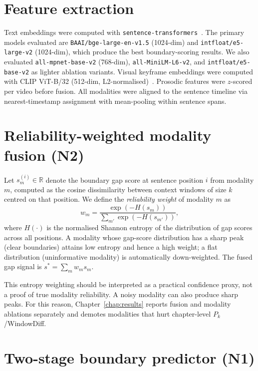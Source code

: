 \section{Feature extraction}
\label{sec:features}

Text embeddings were computed with \texttt{sentence-transformers}~\citep{reimers2019sbert}.
The primary models evaluated are \texttt{BAAI/bge-large-en-v1.5} (1024-dim) and
\texttt{intfloat/e5-large-v2} (1024-dim), which produce the best boundary-scoring
results. We also evaluated \texttt{all-mpnet-base-v2} (768-dim), \texttt{all-MiniLM-L6-v2},
and \texttt{intfloat/e5-base-v2} as lighter ablation variants.
Visual keyframe embeddings were computed with CLIP ViT-B/32
(512-dim, L2-normalised)~\citep{radford2021clip}.
Prosodic features were $z$-scored per video before fusion.
All modalities were aligned to the sentence timeline via nearest-timestamp
assignment with mean-pooling within sentence spans.

\section{Reliability-weighted modality fusion (N2)}
\label{sec:fusion}

Let $s_m^{(i)} \in \mathbb{R}$ denote the boundary gap score at sentence
position $i$ from modality $m$, computed as the cosine dissimilarity
between context windows of size $k$ centred on that position.
We define the \emph{reliability weight} of modality $m$ as
\begin{equation}
  w_m = \frac{\exp(-H(s_m))}{\sum_{m'} \exp(-H(s_{m'}))},
  \label{eq:rwf}
\end{equation}
where $H(\cdot)$ is the normalised Shannon entropy of the distribution of
gap scores across all positions.
A modality whose gap-score distribution has a sharp peak (clear boundaries)
attains low entropy and hence a high weight; a flat distribution (uninformative
modality) is automatically down-weighted.
The fused gap signal is $s^* = \sum_m w_m s_m$.

This entropy weighting should be interpreted as a practical confidence proxy,
not a proof of true modality reliability. A noisy modality can also produce
sharp peaks. For this reason, Chapter~\ref{chap:results} reports fusion and
modality ablations separately and demotes modalities that hurt chapter-level
$P_k$/WindowDiff.

\section{Two-stage boundary predictor (N1)}
\label{sec:boundary}


